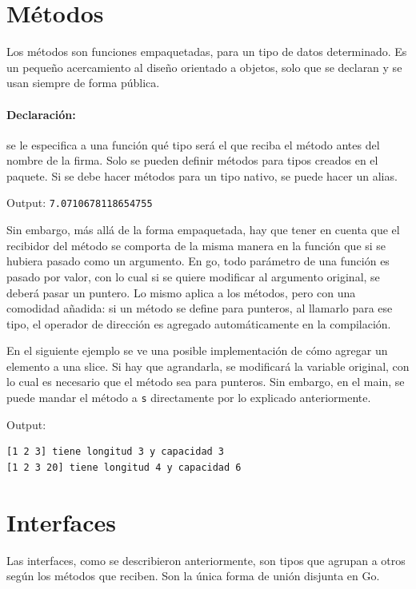 \documentclass{article}
\begin{document}
\section{Métodos}
Los métodos son funciones empaquetadas, para un tipo de datos determinado. Es un pequeño acercamiento al diseño orientado a objetos, solo que se declaran y se usan siempre de forma pública.

\paragraph{Declaración:} se le especifica a una función qué tipo será el que reciba el método antes del nombre de la firma. Solo se pueden definir métodos para tipos creados en el paquete. Si se debe hacer métodos para un tipo nativo, se puede hacer un alias.


Output: \verb|7.0710678118654755|

Sin embargo, más allá de la forma empaquetada, hay que tener en cuenta que el recibidor del método se comporta de la misma manera en la función que si se hubiera pasado como un argumento\cite{method_int}. 
En go, todo parámetro de una función es pasado por valor, con lo cual si se quiere modificar al argumento original, se deberá pasar un puntero. Lo mismo aplica a los métodos, pero con una comodidad añadida: si un método se define para punteros, al llamarlo para ese tipo, el operador de dirección es agregado automáticamente en la compilación\cite{methods_ef}. 

En el siguiente ejemplo se ve una posible implementación de cómo agregar un elemento a una slice. Si hay que agrandarla, se modificará la variable original, con lo cual es necesario que el método sea para punteros. Sin embargo, en el main, se puede mandar el método a \verb|s| directamente por lo explicado anteriormente. 

Output: 
\begin{verbatim}
[1 2 3] tiene longitud 3 y capacidad 3
[1 2 3 20] tiene longitud 4 y capacidad 6
\end{verbatim}

\section{Interfaces}
Las interfaces, como se describieron anteriormente, son tipos que agrupan a otros según los métodos que reciben. Son la única forma de unión disjunta en Go.
\end{document}
